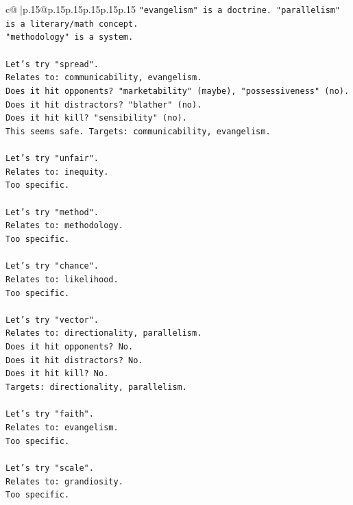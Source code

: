 \documentclass{article}
\begin{document}
{\begin{supertabular}{c@{$\;$}|p{.15\linewidth}@{}p{.15\linewidth}p{.15\linewidth}p{.15\linewidth}p{.15\linewidth}p{.15\linewidth}}
{{{\texttt{"evangelism" is a doctrine. "parallelism" is a literary/math concept.} \\
\texttt{"methodology" is a system.} \\
\\ 
\texttt{Let's try "spread".} \\
\texttt{Relates to: communicability, evangelism.} \\
\texttt{Does it hit opponents? "marketability" (maybe), "possessiveness" (no).} \\
\texttt{Does it hit distractors? "blather" (no).} \\
\texttt{Does it hit kill? "sensibility" (no).} \\
\texttt{This seems safe. Targets: communicability, evangelism.} \\
\\ 
\texttt{Let's try "unfair".} \\
\texttt{Relates to: inequity.} \\
\texttt{Too specific.} \\
\\ 
\texttt{Let's try "method".} \\
\texttt{Relates to: methodology.} \\
\texttt{Too specific.} \\
\\ 
\texttt{Let's try "chance".} \\
\texttt{Relates to: likelihood.} \\
\texttt{Too specific.} \\
\\ 
\texttt{Let's try "vector".} \\
\texttt{Relates to: directionality, parallelism.} \\
\texttt{Does it hit opponents? No.} \\
\texttt{Does it hit distractors? No.} \\
\texttt{Does it hit kill? No.} \\
\texttt{Targets: directionality, parallelism.} \\
\\ 
\texttt{Let's try "faith".} \\
\texttt{Relates to: evangelism.} \\
\texttt{Too specific.} \\
\\ 
\texttt{Let's try "scale".} \\
\texttt{Relates to: grandiosity.} \\
\texttt{Too specific.} \\
}}}
\end{supertabular}}
\end{document}
